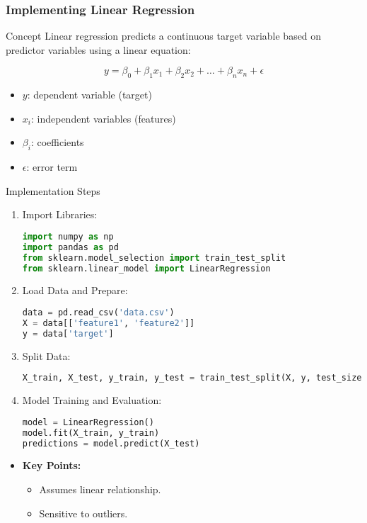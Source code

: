 \documentclass[aspectratio=169]{beamer}
\begin{document}
\begin{frame}[fragile]
    \frametitle{Implementing Linear Regression}
    \begin{block}{Concept}
        Linear regression predicts a continuous target variable based on predictor variables using a linear equation:
    \end{block}
    
    \begin{equation}
        y = \beta_0 + \beta_1 x_1 + \beta_2 x_2 + \ldots + \beta_n x_n + \epsilon 
    \end{equation}
    
    \begin{itemize}
        \item $y$: dependent variable (target)
        \item $x_i$: independent variables (features)
        \item $\beta_i$: coefficients
        \item $\epsilon$: error term
    \end{itemize}
    
    \begin{block}{Implementation Steps}
        \begin{enumerate}
            \item Import Libraries:
            \begin{lstlisting}[language=Python]
import numpy as np
import pandas as pd
from sklearn.model_selection import train_test_split
from sklearn.linear_model import LinearRegression
            \end{lstlisting}
            \item Load Data and Prepare:
            \begin{lstlisting}[language=Python]
data = pd.read_csv('data.csv')
X = data[['feature1', 'feature2']]
y = data['target']
            \end{lstlisting}
            \item Split Data:
            \begin{lstlisting}[language=Python]
X_train, X_test, y_train, y_test = train_test_split(X, y, test_size=0.2, random_state=42)
            \end{lstlisting}
            \item Model Training and Evaluation:
            \begin{lstlisting}[language=Python]
model = LinearRegression()
model.fit(X_train, y_train)
predictions = model.predict(X_test)
            \end{lstlisting}
        \end{enumerate}
    \end{block}

    \begin{itemize}
        \item \textbf{Key Points:}
        \begin{itemize}
            \item Assumes linear relationship.
            \item Sensitive to outliers.
        \end{itemize}
    \end{itemize}
\end{frame}
\end{document}
